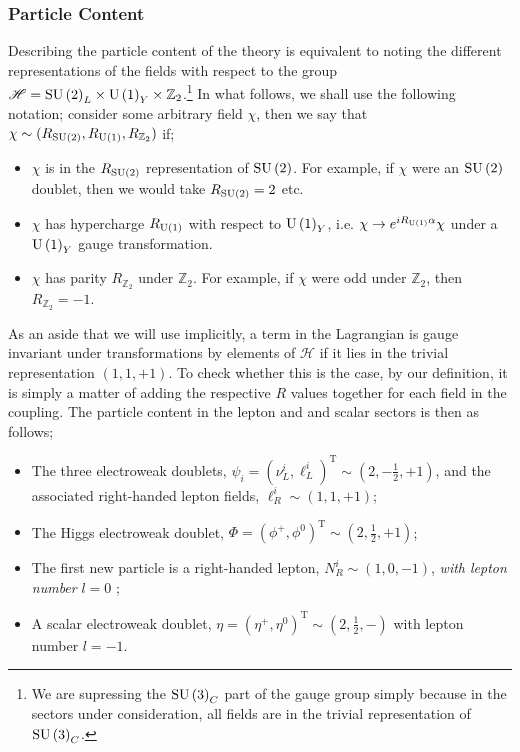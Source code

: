 \documentclass[10pt]{article}
\begin{document}
\subsubsection{Particle Content}\label{sec:particle content}
Describing the particle content of the theory is equivalent to noting the different representations of the fields with respect to the group $\mathscr{H} = \textrm{SU}\left(2\right)_L \times \textrm{U}\left(1\right)_Y \times \mathbb{Z}_2$.\footnote{We are supressing the $\textrm{SU}\left(3\right)_C$ part of the gauge group simply because in the sectors under consideration, all fields are in the trivial representation of $\textrm{SU}\left(3\right)_C$.} In what follows, we shall use the following notation; consider some arbitrary field $\chi$, then we say that $\chi \sim (R_{\textrm{SU}\left(2\right)}, R_{\textrm{U}\left(1\right)}, R_{\mathbb{Z}_2})$ if;
\begin{itemize}
  \item $\chi$ is in the $R_{\textrm{SU}\left(2\right)}$ representation of $\textrm{SU}\left(2\right)$. For example, if $\chi$ were an $\textrm{SU}\left(2\right)$ doublet, then we would take $R_{\textrm{SU}\left(2\right)} = 2$ etc.
  \item $\chi$ has hypercharge $R_{\textrm{U}\left(1\right)}$ with respect to $\textrm{U}\left(1\right)_Y$, i.e. $\chi \rightarrow e^{iR_{\textrm{U}\left(1\right)}\alpha}\chi$ under a $\textrm{U}\left(1\right)_Y$ gauge transformation.
  \item $\chi$ has parity $R_{\mathbb{Z}_2}$ under $\mathbb{Z}_2$. For example, if $\chi$ were odd under $\mathbb{Z}_2$, then $R_{\mathbb{Z}_2} = -1$.
\end{itemize}
As an aside that we will use implicitly, a term in the Lagrangian is gauge invariant under transformations by elements of $\mathscr{H}$ if it lies in the trivial representation $(1, 1, +1)$. To check whether this is the case, by our definition, it is simply a matter of adding the respective $R$ values together for each field in the coupling. The particle content in the lepton and and scalar sectors is then as follows;
\begin{itemize}
  \item The three electroweak doublets, $\psi_i = (\nu^i_L, \ell^i_L)^{\textrm{T}} \sim (2, -\tfrac{1}{2}, +1)$, and the associated right-handed lepton fields, $\ell^i_R \sim (1, 1, +1)$;
  \item The Higgs electroweak doublet, $\Phi = (\phi^+, \phi^0)^{\textrm{T}} \sim (2, \tfrac{1}{2}, +1)$;
  \item The first new particle is a right-handed lepton, $N^i_R \sim (1, 0, -1)$, \textit{with lepton number} $l = 0$ \cite{Ma2001};
  \item A scalar electroweak doublet, $\eta = (\eta^+, \eta^0)^{\textrm{T}} \sim (2, \tfrac{1}{2}, -)$ with lepton number $l = -1$.
\end{itemize}
\end{document}
